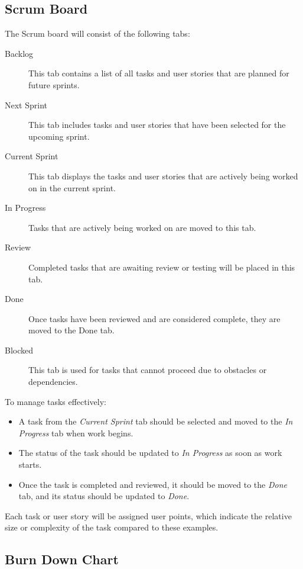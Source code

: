 \documentclass{projdoc}
\begin{document}
\subsection{Scrum Board}

The Scrum board \autocite{miro:scrum-board} will consist of the following tabs:

\begin{description}
	\item[Backlog] This tab contains a list of all tasks and user stories that are
		planned for future sprints.
	\item[Next Sprint] This tab includes tasks and user stories that have been selected
		for the upcoming sprint.
	\item[Current Sprint] This tab displays the tasks and user stories that are
		actively being worked on in the current sprint.
	\item[In Progress] Tasks that are actively being worked on are moved to this tab.
	\item[Review] Completed tasks that are awaiting review or testing will be placed in
		this tab.
	\item[Done] Once tasks have been reviewed and are considered complete, they are
		moved to the Done tab.
	\item [Blocked] This tab is used for tasks that cannot proceed due to obstacles or
		dependencies.
\end{description}

To manage tasks effectively:

\begin{itemize}
	\item A task from the \emph{Current Sprint} tab should be selected and moved to the
		\emph{In Progress} tab when work begins. 
	\item The status of the task should be updated to \emph{In Progress} as soon as
		work starts.
	\item Once the task is completed and reviewed, it should be moved to the
		\emph{Done} tab, and its status should be updated to \emph{Done}.
\end{itemize}

Each task or user story will be assigned user points, which indicate the relative
size or complexity of the task compared to these examples.

\subsection{Burn Down Chart}
\end{document}
